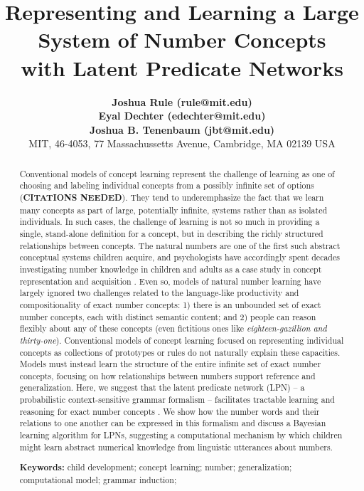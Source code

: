 \documentclass[10pt,letterpaper]{article}
\title{Representing and Learning a Large System of Number Concepts \\ with Latent Predicate Networks}
\author{
  {\large \bf Joshua Rule (rule@mit.edu)}\\
  {\large \bf Eyal Dechter (edechter@mit.edu)}\\
  {\large \bf Joshua B. Tenenbaum (jbt@mit.edu)}\\
  MIT, 46-4053, 77 Massachussetts Avenue, Cambridge, MA 02139 USA}
\begin{document}
\maketitle

\begin{abstract}
  Conventional models of concept learning represent the challenge of
  learning as one of choosing and labeling individual concepts from a
  possibly infinite set of options ({\bf CITATIONS NEEDED}). They tend
  to underemphasize the fact that we learn many concepts as part of
  large, potentially infinite, systems rather than as isolated
  individuals. In such cases, the challenge of learning is not so much
  in providing a single, stand-alone definition for a concept, but in
  describing the richly structured relationships between concepts. The
  natural numbers are one of the first such abstract conceptual
  systems children acquire, and psychologists have accordingly spent
  decades investigating number knowledge in children and adults as a
  case study in concept representation and acquisition
  \citep{fuson1988children,galGel2005,Car2009}. Even so, models of
  natural number learning have largely ignored two challenges related
  to the language-like productivity and compositionality of exact
  number concepts: 1) there is an unbounded set of exact number
  concepts, each with distinct semantic content; and 2) people can
  reason flexibly about any of these concepts (even fictitious ones
  like \emph{eighteen-gazillion and thirty-one}). Conventional models
  of concept learning focused on representing individual concepts as
  collections of prototypes or rules do not naturally explain these
  capacities. Models must instead learn the structure of the entire
  infinite set of exact number concepts, focusing on how relationships
  between numbers support reference and generalization. Here, we
  suggest that the latent predicate network (LPN) -- a probabilistic
  context-sensitive grammar formalism -- facilitates tractable
  learning and reasoning for exact number concepts
  \citep{DecRulTenming}. We show how the number words and their
  relations to one another can be expressed in this formalism and
  discuss a Bayesian learning algorithm for LPNs, suggesting a
  computational mechanism by which children might learn abstract
  numerical knowledge from linguistic utterances about numbers.

  \textbf{Keywords:}
  child development; concept learning; number; generalization;
  computational model; grammar induction;
\end{abstract}
\end{document}
